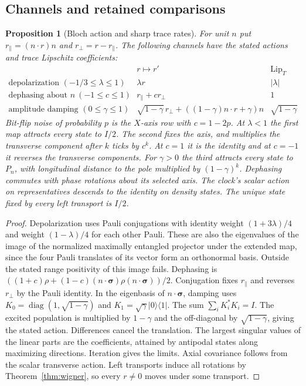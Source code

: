 \documentclass[aps,pra,onecolumn,superscriptaddress,nofootinbib,10pt]{revtex4-2}
\newtheorem{proposition}[theorem]{Proposition}
\theoremstyle{definition}
\theoremstyle{remark}
\begin{document}
\subsection{Channels and retained comparisons}\label{ob:channels}

\begin{proposition}[Bloch action and sharp trace rates]\label{ob:noise}
For unit $n$ put $r_\parallel=(n\cdot r)n$ and $r_\perp=r-r_\parallel$.
The following channels have the stated actions and trace Lipschitz coefficients:
\[
\begin{array}{l|c|c}
 & r\mapsto r' & \operatorname{Lip}_T\\ \hline
\text{depolarization }(-1/3\le\lambda\le1)&\lambda r&|\lambda|\\
\text{dephasing about }n\ (-1\le c\le1)&r_\parallel+c r_\perp&1\\
\text{amplitude damping }(0\le\gamma\le1)
 & \sqrt{1-\gamma}\,r_\perp+((1-\gamma)n\cdot r+\gamma)n
 &\sqrt{1-\gamma}
\end{array}
\]
Bit-flip noise of probability $p$ is the $X$-axis row with $c=1-2p$.
At $\lambda<1$ the first map attracts every state to $I/2$.
The second fixes the axis, and multiplies the transverse component
after $k$ ticks by $c^k$. At $c=1$ it is the identity and at $c=-1$
it reverses the transverse components. For $\gamma>0$ the third
attracts every state to $P_n$, with longitudinal distance to the pole
multiplied by $(1-\gamma)^k$. Dephasing commutes with phase rotations
about its selected axis. The clock's scalar action on representatives
descends to the identity on density states. The unique state fixed by
every left transport is $I/2$.
\end{proposition}
\begin{proof}
Depolarization uses Pauli conjugations with identity weight
$(1+3\lambda)/4$ and weight $(1-\lambda)/4$ for each other Pauli.
These are also the eigenvalues of the image of the normalized
maximally entangled projector under the extended map, since the
four Pauli translates of its vector form an orthonormal basis.
Outside the stated range positivity of this image fails.
Dephasing is
$((1+c)\rho+(1-c)(n\cdot\boldsymbol{\sigma})\rho(n\cdot\boldsymbol{\sigma}))/2$.
Conjugation fixes $r_\parallel$ and reverses $r_\perp$ by the Pauli identity.
In the eigenbasis of $n\cdot\boldsymbol{\sigma}$, damping uses
$K_0=\operatorname{diag}(1,\sqrt{1-\gamma})$ and
$K_1=\sqrt\gamma|0\rangle\langle1|$. The sum $\sum_i K_i^*K_i=I$.
The excited population is multiplied by $1-\gamma$ and the
off-diagonal by $\sqrt{1-\gamma}$, giving the stated action.
Differences cancel the translation. The largest singular values of the
linear parts are the coefficients, attained by antipodal states along
maximizing directions. Iteration gives the limits. Axial covariance
follows from the scalar transverse action. Left transports induce
all rotations by Theorem~\ref{thm:wigner}, so every $r\ne0$ moves
under some transport.
\end{proof}
\end{document}
